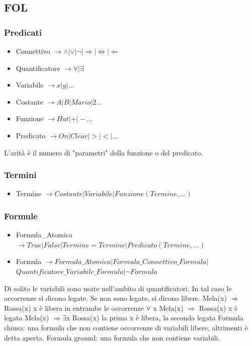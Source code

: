 \documentclass{article}
\begin{document}
\subsection{FOL}
\subsubsection{Predicati}
\begin{itemize}
    \item Connettivo $\rightarrow \land | \lor | \neg | \Rightarrow | \Leftrightarrow | \Leftarrow$
    \item Quantificatore $\rightarrow \forall | \exists $
    \item Variabile $\rightarrow x | y | ...$
    \item Costante $\rightarrow A | B | Mario | 2 ...$
    \item Funzione $\rightarrow Hat | + | - ...$
    \item Predicato $\rightarrow On | Clear | > | < | ...$
\end{itemize}
L'arità è il numero di "parametri" della funzione o del predicato.
\subsubsection{Termini}
\begin{itemize}
    \item Termine $\rightarrow Costante | Variabile | Funzione(Termine,...)$
\end{itemize}
\subsubsection{Formule}
\begin{itemize}
    \item Formula\_Atomica $ \rightarrow True | False | Termine=Termine | Predicato(Termine,...)$
    \item Formula $\rightarrow Formula\_Atomica | Formula\_Connettivo\_Formula |$ \newline $Quantificatore\_Variabile\_Formula | \neg Formula$
\end{itemize}
Di solito le variabili sono usate nell'ambito di quantificatori. In tal caso le occorrenze si dicono legate. Se non sono legate, si dicono libere. \newline
    Mela(x) $\Rightarrow$ Rossa(x) \quad x è libera in entrambe le occorrenze \newline
	$\forall$ x Mela(x) $\Rightarrow$ Rossa(x) \quad x è legata \newline
	Mela(x) $\Rightarrow \exists$x Rossa(x) \quad la prima x è libera, la seconda legata \newline
Formula chiusa: una formula che non contiene occorrenze di variabili libere, altrimenti è detta aperta.\newline
Formula ground: una formula che non contiene variabili.
\end{document}
